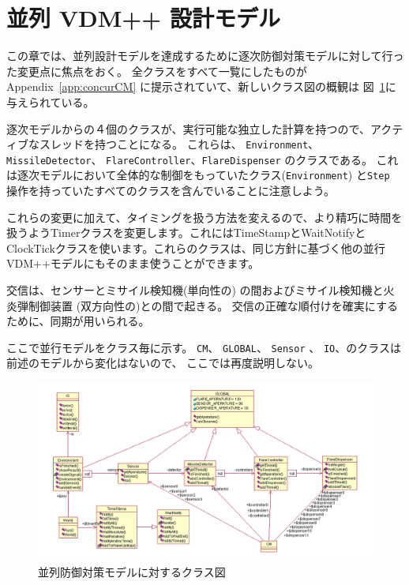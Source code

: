 \documentclass[\pformat,12pt]{jreport}
\begin{document}
\section{並列 VDM++ 設計モデル}\label{sec:concurmod}

この章では、並列設計モデルを達成するために逐次防御対策モデルに対して行った変更点に焦点をおく。
全クラスをすべて一覧にしたものがAppendix~\ref{app:concurCM} に提示されていて、新しいクラス図の概観は 図~\ref{fig:classdiagconcur}に与えられている。

逐次モデルからの４個のクラスが、実行可能な独立した計算を持つので、アクティブなスレッドを持つことになる。
これらは、 \texttt{Environment}、\texttt{MissileDetector}、 \texttt{FlareController}、\texttt{FlareDispenser} のクラスである。
これは逐次モデルにおいて全体的な制御をもっていたクラス(\texttt{Environment}) と\texttt{Step} 操作を持っていたすべてのクラスを含んでいることに注意しよう。

これらの変更に加えて、タイミングを扱う方法を変えるので、より精巧に時間を扱うようTimerクラスを変更します。これにはTimeStampとWaitNotifyとClockTickクラスを使います。これらのクラスは、同じ方針に基づく他の並行VDM++モデルにもそのまま使うことができます。

交信は、センサーとミサイル検知機(単向性の) の間およびミサイル検知機と火炎弾制御装置 (双方向性の)との間で起きる。
交信の正確な順付けを確実にするために、同期が用いられる。

ここで並行モデルをクラス毎に示す。
 \texttt{CM}、 \texttt{GLOBAL}、 \texttt{Sensor} 、 \texttt{IO}、のクラスは前述のモデルから変化はないので、 ここでは再度説明しない。

\begin{figure}
\begin{center}
\includegraphics[width=\textwidth]{concurCMclassdiag}
\end{center}
\caption{並列防御対策モデルに対するクラス図\label{fig:classdiagconcur}}
\end{figure}
\end{document}
